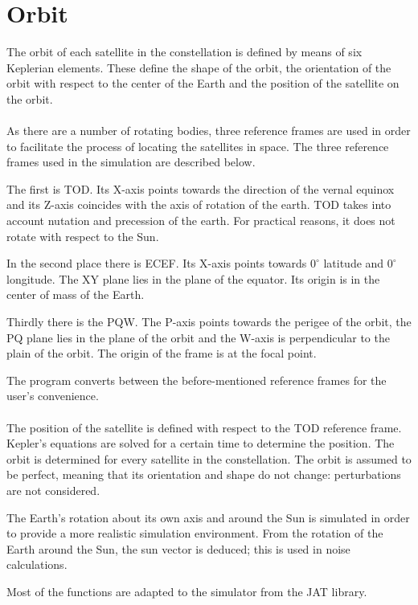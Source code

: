 \section{Orbit}
\label{orbit}
The orbit of each satellite in the constellation is defined by means of six Keplerian elements. These define the shape of the orbit, the orientation of the orbit with respect to the center of the Earth and the position of the satellite on the orbit.\\\\
As there are a number of rotating bodies, three reference frames are used in order to facilitate the process of locating the satellites in space. The three reference frames used in the simulation are described below.

The first is \ac{TOD}. Its X-axis points towards the direction of the vernal equinox and its Z-axis coincides with the axis of rotation of the earth. \ac{TOD} takes into account nutation and precession of the earth. For practical reasons, it does not rotate with respect to the Sun.
 
In the second place there is \ac{ECEF}. Its X-axis points towards $0^\circ$ latitude and $0^\circ$ longitude. The XY plane lies in the plane of the equator. Its origin is in the center of mass of the Earth. 

Thirdly there is the PQW. The P-axis points towards the perigee of the orbit, the PQ plane lies in the plane of the orbit and the W-axis is perpendicular to the plain of the orbit. The origin of the frame is at the focal point. 

The program converts between the before-mentioned reference frames for the user's convenience.\\\\
The position of the satellite is defined with respect to the \acs{TOD} reference frame. Kepler's equations are solved for a certain time to determine the position. The orbit is determined for every satellite in the constellation. The orbit is assumed to be perfect, meaning that its orientation and shape do not change: perturbations are not considered. 

The Earth's rotation about its own axis and around the Sun is simulated in order to provide a more realistic simulation environment. From the rotation of the Earth around the Sun, the sun vector is deduced; this is used in noise calculations.

Most of the functions are adapted to the simulator from the \ac{JAT} library. 

